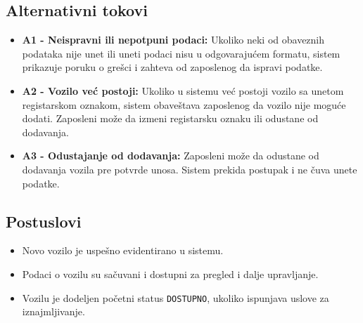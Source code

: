 \subsection{Alternativni tokovi}

\begin{itemize}
    \item \textbf{A1 - Neispravni ili nepotpuni podaci:} 
    Ukoliko neki od obaveznih podataka nije unet ili uneti podaci nisu u odgovarajućem formatu, sistem prikazuje poruku o grešci i zahteva od zaposlenog da ispravi podatke.

    \item \textbf{A2 - Vozilo već postoji:} 
    Ukoliko u sistemu već postoji vozilo sa unetom registarskom oznakom, sistem obaveštava zaposlenog da vozilo nije moguće dodati. Zaposleni može da izmeni registarsku oznaku ili odustane od dodavanja.

    \item \textbf{A3 - Odustajanje od dodavanja:} 
    Zaposleni može da odustane od dodavanja vozila pre potvrde unosa. Sistem prekida postupak i ne čuva unete podatke.
\end{itemize}

\subsection{Postuslovi}

\begin{itemize}
    \item Novo vozilo je uspešno evidentirano u sistemu.
    \item Podaci o vozilu su sačuvani i dostupni za pregled i dalje upravljanje.
    \item Vozilu je dodeljen početni status \texttt{DOSTUPNO}, ukoliko ispunjava uslove za iznajmljivanje.
\end{itemize}
